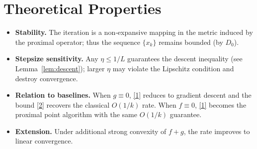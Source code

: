 \documentclass{article}
\begin{document}
\section*{Theoretical Properties}
\begin{itemize}
\item \textbf{Stability.} The iteration is a non‑expansive mapping in the metric induced by the proximal operator; thus the sequence $\{x_{k}\}$ remains bounded (by $D_{0}$).  
\item \textbf{Stepsize sensitivity.} Any $\eta\le 1/L$ guarantees the descent inequality (see Lemma~\ref{lem:descent}); larger $\eta$ may violate the Lipschitz condition and destroy convergence.  
\item \textbf{Relation to baselines.} When $g\equiv0$, \eqref{1} reduces to gradient descent and the bound \eqref{2} recovers the classical $O(1/k)$ rate. When $f\equiv0$, \eqref{1} becomes the proximal point algorithm with the same $O(1/k)$ guarantee.  
\item \textbf{Extension.} Under additional strong convexity of $f+g$, the rate improves to linear convergence.
\end{itemize}
\end{document}
